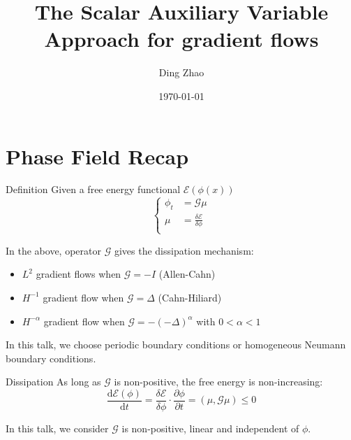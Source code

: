 \documentclass[9pt]{beamer}
\begin{document}
    \title{The Scalar Auxiliary Variable Approach for gradient flows}
    \author{Ding Zhao}
    \date{\today}
    \frame{\titlepage}

\section{Phase Field Recap}

\begin{frame}{Definition}
Given a free energy functional $\mathcal E(\phi(x))$
$$\left\{
\begin{aligned}
\phi_t &= \mathcal{G} \mu \\
\mu &= \frac{\delta \mathcal E}{\delta \phi} \\
\end{aligned}
\right.$$

In the above,  operator $\mathcal G$ gives the dissipation mechanism:
\begin{itemize}
\item{$L^2$ gradient flows when $\mathcal G = -I$} (Allen-Cahn)
\item{$H^{-1}$ gradient flow when $\mathcal G = \Delta$} (Cahn-Hiliard)
 \item{$H^{-\alpha}$ gradient flow when $\mathcal G = -(-\Delta)^{\alpha}$ with $0 < \alpha < 1$}
\end{itemize}
In this talk, we choose periodic boundary conditions or  homogeneous Neumann boundary conditions. %
\end{frame}

\begin{frame}{Dissipation}
As long as $\mathcal G$ is non-positive, the free energy is non-increasing:
$$\frac{\mathrm{d} \mathcal{E}(\phi)}{\mathrm{d} t}=\frac{\delta \mathcal{E}}{\delta \phi} \cdot \frac{\partial \phi}{\partial t}=(\mu, \mathcal{G} \mu) \leq 0$$

In this talk, we consider $\mathcal G$ is non-positive, linear and independent of $\phi$.
\end{frame}
\end{document}
